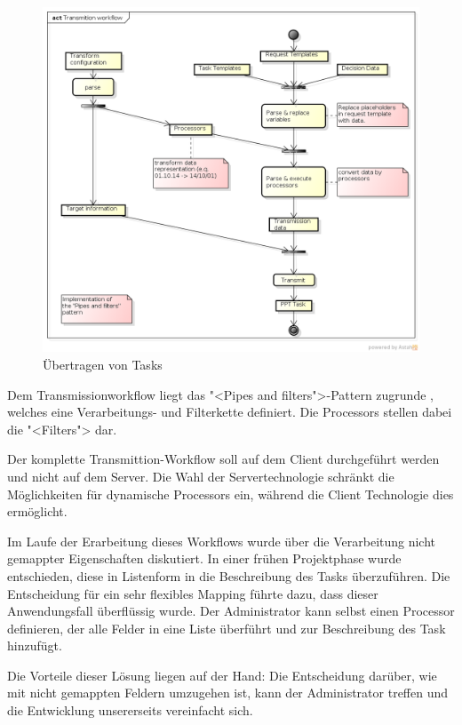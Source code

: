 			\begin{figure}[H]
				\includegraphics[width=\textwidth]{architecture/media/img/transmissionWorkflow.png}
				\centering
				\caption{Übertragen von Tasks}
				\label{fig:transmissionWorkflow}
			\end{figure}
			
			Dem Transmissionworkflow liegt das "<Pipes and filters">-Pattern zugrunde
			 \cite{hope_enterprise_2003}, welches eine Verarbeitungs- und Filterkette definiert.
			 Die Processors stellen dabei die "<Filters"> dar.
			
			Der komplette Transmittion-Workflow soll auf dem Client durchgeführt werden und nicht auf dem Server. 
			Die Wahl der Servertechnologie schränkt die Möglichkeiten für dynamische Processors ein, während die Client Technologie dies ermöglicht.
			
			Im Laufe der Erarbeitung dieses Workflows wurde über die Verarbeitung nicht gemappter Eigenschaften diskutiert. 
			In einer frühen Projektphase wurde entschieden, diese in Listenform in die Beschreibung des Tasks überzuführen. 
			Die Entscheidung für ein sehr flexibles Mapping führte dazu, 
			dass dieser Anwendungsfall überflüssig wurde.
			Der Administrator kann selbst einen Processor definieren, der alle Felder in eine Liste überführt und zur Beschreibung des Task hinzufügt.
			
			Die Vorteile dieser Lösung liegen auf der Hand: Die Entscheidung darüber, 
			wie mit nicht gemappten Feldern umzugehen ist, kann der Administrator treffen
			und die Entwicklung unsererseits vereinfacht sich.
			
